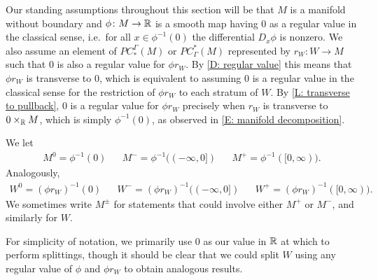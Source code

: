 Our standing assumptions throughout this section will be that $M$ is a manifold without boundary and $\phi \colon M \to \mathbb{R}$ is a smooth map having $0$ as a regular value in the classical sense, i.e.\ for all $x \in \phi^{-1}(0)$ the differential $D_x\phi$ is nonzero.
We also assume an element of $PC_*^\Gamma(M)$ or $PC^*_\Gamma(M)$ represented by $r_W \colon W \to M$ such that $0$ is also a regular value for $\phi r_W$.
By \cref{D: regular value} this means that $\phi r_W$ is transverse to $0$, which is equivalent to assuming $0$ is a regular value in the classical sense for the restriction of $\phi r_W$ to each stratum of $W$.
By \cref{L: transverse to pullback}, $0$ is a regular value for $\phi r_W$ precisely when $r_W$ is transverse to $0 \times_{\mathbb{R}} M$, which is simply $\phi^{-1}(0)$, as observed in \cref{E: manifold decomposition}.

We let
\begin{align*}
	M^0 = \phi^{-1}(0) && M^- = \phi^{-1}((-\infty,0]) &&M^+ = \phi^{-1}([0,\infty)).
\end{align*}
Analogously,
\begin{align*}
	W^0 = (\phi r_W)^{-1}(0) && W^- = (\phi r_W)^{-1}((-\infty,0]) && W^+ = (\phi r_W)^{-1}([0,\infty)).
\end{align*}
We sometimes write $M^\pm$ for statements that could involve either $M^+$ or $M^-$, and similarly for $W$.

\begin{remark}
	For simplicity of notation, we primarily use $0$ as our value in $\mathbb{R}$ at which to perform splittings, though it should be clear that we could split $W$ using any regular value of $\phi$ and $\phi r_W$ to obtain analogous results.
\end{remark}

